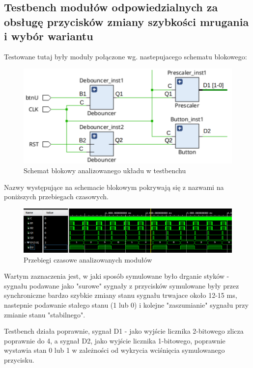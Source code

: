 \documentclass{article}
\begin{document}
\subsection{Testbench modułów odpowiedzialnych za obsługę przycisków zmiany szybkości mrugania i wybór wariantu}
Testowane tutaj były moduły połączone wg. nastepujacego schematu blokowego:
\begin{figure} [H]
	\begin{center}
			\includegraphics[scale = 0.5]{testbench1.png}
			\caption{Schemat blokowy analizowanego układu w testbenchu}
\end{center}
\end{figure}
Nazwy występujące na schemacie blokowym pokrywają się z nazwami na poniższych przebiegach czasowych.
\begin{figure} [H]
	\begin{center}
			\includegraphics[width = \textwidth]{przebiegi1.png}
			\caption{Przebiegi czasowe analizowanych modułów}
\end{center}
\end{figure}
Wartym zaznaczenia jest, w jaki sposób symulowane było drganie styków - sygnału podawane jako "surowe" sygnały z przycisków symulowane były przez
synchroniczne bardzo szybkie zmiany stanu sygnału trwajace około 12-15 ms, nastepnie podawanie stałego stanu (1 lub 0) i kolejne "zaszumianie" sygnału przy zmianie stanu "stabilnego".

Testbench działa poprawnie, sygnał D1 - jako wyjście licznika 2-bitowego zlicza poprawnie do 4, a sygnał D2, jako wyjście licznika 1-bitowego, poprawnie wystawia stan 0 lub 1 
w zależności od wykrycia wciśnięcia symulowanego przycisku.
\end{document}

